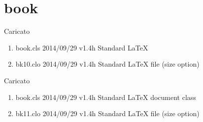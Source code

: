 	\section{book}
	
	Caricato 
		\begin{enumerate}
			\item book.cls 2014/09/29 v1.4h Standard LaTeX 
			\item bk10.clo 2014/09/29 v1.4h Standard LaTeX file (size option)
		\end{enumerate}
	
	Caricato 
	\begin{enumerate}
		\item book.cls 2014/09/29 v1.4h Standard LaTeX document class
		\item bk11.clo 2014/09/29 v1.4h Standard LaTeX file (size option)
	\end{enumerate}

	
